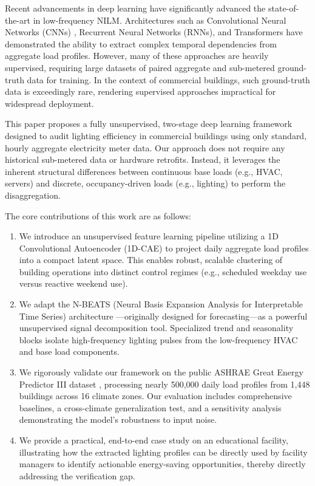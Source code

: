 Recent advancements in deep learning have significantly advanced the state-of-the-art in low-frequency NILM. Architectures such as Convolutional Neural Networks (CNNs) \cite{zhang_2018}, Recurrent Neural Networks (RNNs), and Transformers \cite{bert4nilm} have demonstrated the ability to extract complex temporal dependencies from aggregate load profiles. However, many of these approaches are heavily supervised, requiring large datasets of paired aggregate and sub-metered ground-truth data for training. In the context of commercial buildings, such ground-truth data is exceedingly rare, rendering supervised approaches impractical for widespread deployment.

This paper proposes a fully unsupervised, two-stage deep learning framework designed to audit lighting efficiency in commercial buildings using only standard, hourly aggregate electricity meter data. Our approach does not require any historical sub-metered data or hardware retrofits. Instead, it leverages the inherent structural differences between continuous base loads (e.g., HVAC, servers) and discrete, occupancy-driven loads (e.g., lighting) to perform the disaggregation.

The core contributions of this work are as follows:
\begin{enumerate}
    \item We introduce an unsupervised feature learning pipeline utilizing a 1D Convolutional Autoencoder (1D-CAE) to project daily aggregate load profiles into a compact latent space. This enables robust, scalable clustering of building operations into distinct control regimes (e.g., scheduled weekday use versus reactive weekend use).
    \item We adapt the N-BEATS (Neural Basis Expansion Analysis for Interpretable Time Series) architecture \cite{nbeats_2020}---originally designed for forecasting---as a powerful unsupervised signal decomposition tool. Specialized trend and seasonality blocks isolate high-frequency lighting pulses from the low-frequency HVAC and base load components.
    \item We rigorously validate our framework on the public ASHRAE Great Energy Predictor III dataset \cite{ashrae_2020}, processing nearly 500,000 daily load profiles from 1,448 buildings across 16 climate zones. Our evaluation includes comprehensive baselines, a cross-climate generalization test, and a sensitivity analysis demonstrating the model's robustness to input noise.
    \item We provide a practical, end-to-end case study on an educational facility, illustrating how the extracted lighting profiles can be directly used by facility managers to identify actionable energy-saving opportunities, thereby directly addressing the verification gap.
\end{enumerate}

